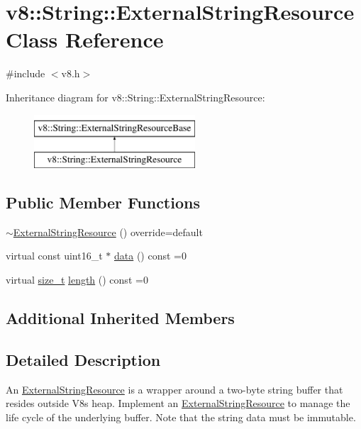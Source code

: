 \hypertarget{classv8_1_1String_1_1ExternalStringResource}{}\section{v8\+:\+:String\+:\+:External\+String\+Resource Class Reference}
\label{classv8_1_1String_1_1ExternalStringResource}


{\ttfamily \#include $<$v8.\+h$>$}

Inheritance diagram for v8\+:\+:String\+:\+:External\+String\+Resource\+:\begin{figure}[H]
\begin{center}
\leavevmode
\includegraphics[height=2.000000cm]{classv8_1_1String_1_1ExternalStringResource}
\end{center}
\end{figure}
\subsection*{Public Member Functions}
\begin{DoxyCompactItemize}
\item 
\mbox{\hyperlink{classv8_1_1String_1_1ExternalStringResource_ad5f8c0ca1ed53d7c1ec7b11dc0aef49c}{$\sim$\+External\+String\+Resource}} () override=default
\item 
virtual const uint16\+\_\+t $\ast$ \mbox{\hyperlink{classv8_1_1String_1_1ExternalStringResource_a987309199b848511adb708e221e0fb0a}{data}} () const =0
\item 
virtual \mbox{\hyperlink{classsize__t}{size\+\_\+t}} \mbox{\hyperlink{classv8_1_1String_1_1ExternalStringResource_ab5ca300fea077d7c7774ec49d32e4da1}{length}} () const =0
\end{DoxyCompactItemize}
\subsection*{Additional Inherited Members}


\subsection{Detailed Description}
An \mbox{\hyperlink{classv8_1_1String_1_1ExternalStringResource}{External\+String\+Resource}} is a wrapper around a two-\/byte string buffer that resides outside V8\textquotesingle{}s heap. Implement an \mbox{\hyperlink{classv8_1_1String_1_1ExternalStringResource}{External\+String\+Resource}} to manage the life cycle of the underlying buffer. Note that the string data must be immutable. 

